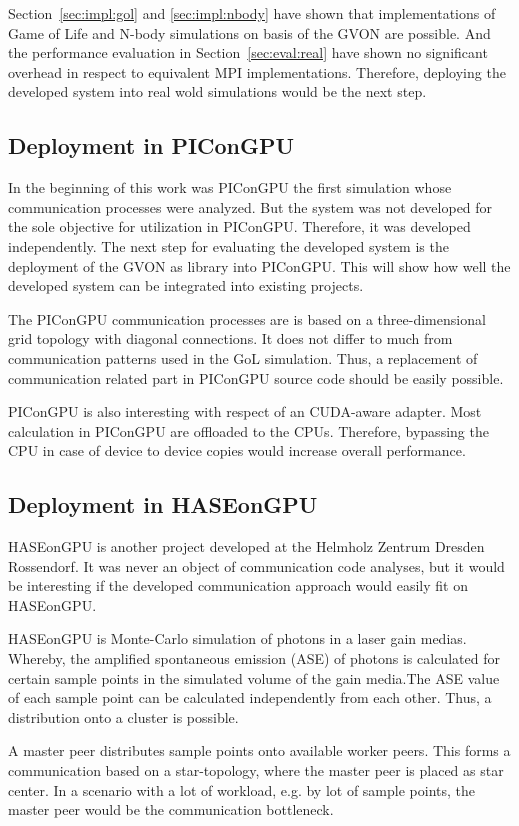 Section~\ref{sec:impl:gol} and \ref{sec:impl:nbody} have shown
that implementations of Game of Life and N-body simulations on basis
of the GVON are possible. And the performance evaluation in
Section~\ref{sec:eval:real} have shown no significant overhead in
respect to equivalent MPI implementations. Therefore, deploying
the developed system into real wold simulations would be the next
step.

\subsection*{Deployment in PIConGPU}
In the beginning of this work was PIConGPU the first simulation
whose communication processes were analyzed. But the system was not
developed for the sole objective for utilization in
PIConGPU. Therefore, it was developed independently.  The next step
for evaluating the developed system is the deployment of the GVON as
library into PIConGPU. This will show how well the developed system
can be integrated into existing projects.

The PIConGPU communication processes are is based on a
three-dimensional grid topology with diagonal connections. It does
not differ to much from communication patterns used in the GoL
simulation. Thus, a replacement of communication related part in
PIConGPU source code should be easily possible.

PIConGPU is also interesting with respect of an CUDA-aware
adapter.  Most calculation in PIConGPU are offloaded to the
CPUs. Therefore, bypassing the CPU in case of device to device
copies would increase overall performance.

\subsection*{Deployment in HASEonGPU}
HASEonGPU is another project developed at the Helmholz Zentrum
Dresden Rossendorf.  It was never an object of communication code
analyses, but it would be interesting if the developed communication
approach would easily fit on HASEonGPU.

HASEonGPU is Monte-Carlo simulation of photons in a laser gain
medias. Whereby, the amplified spontaneous emission (ASE) of photons
is calculated for certain sample points in the simulated volume of
the gain media.The ASE value of each sample point can be calculated
independently from each other. Thus, a distribution onto a cluster
is possible.

A master peer distributes sample points onto
available worker peers. This forms a communication based on a
star-topology, where the master peer is placed as star center. In a
scenario with a lot of workload, e.g. by lot of sample points, the
master peer would be the communication bottleneck.

